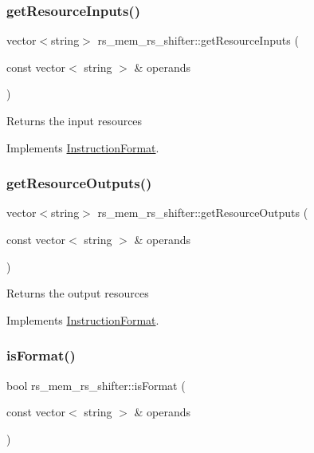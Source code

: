 \subsubsection{\texorpdfstring{get\+Resource\+Inputs()}{getResourceInputs()}}
{\footnotesize\ttfamily vector$<$string$>$ rs\+\_\+mem\+\_\+rs\+\_\+shifter\+::get\+Resource\+Inputs (\begin{DoxyParamCaption}\item[{const vector$<$ string $>$ \&}]{operands }\end{DoxyParamCaption})\hspace{0.3cm}{\ttfamily [virtual]}}

Returns the input resources 

Implements \hyperlink{classInstructionFormat_a09775d3a3c22f40a0f44504664e586e4}{Instruction\+Format}.

\mbox{\label{classrs__mem__rs__shifter_a798cbf0eeae065cffc3acf44a01b2221}} 
\subsubsection{\texorpdfstring{get\+Resource\+Outputs()}{getResourceOutputs()}}
{\footnotesize\ttfamily vector$<$string$>$ rs\+\_\+mem\+\_\+rs\+\_\+shifter\+::get\+Resource\+Outputs (\begin{DoxyParamCaption}\item[{const vector$<$ string $>$ \&}]{operands }\end{DoxyParamCaption})\hspace{0.3cm}{\ttfamily [virtual]}}

Returns the output resources 

Implements \hyperlink{classInstructionFormat_a95cd28ffb1bde59b67f676880ab10536}{Instruction\+Format}.

\mbox{\label{classrs__mem__rs__shifter_a8499ed65e4e65d8ffc0a15f4216de118}} 
\subsubsection{\texorpdfstring{is\+Format()}{isFormat()}}
{\footnotesize\ttfamily bool rs\+\_\+mem\+\_\+rs\+\_\+shifter\+::is\+Format (\begin{DoxyParamCaption}\item[{const vector$<$ string $>$ \&}]{operands }\end{DoxyParamCaption})\hspace{0.3cm}{\ttfamily [virtual]}}

